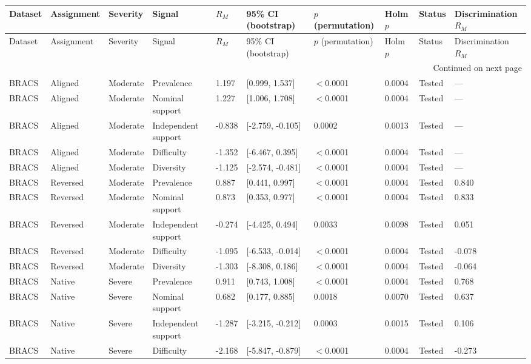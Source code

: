 \begin{longtable}{llllllllll}
\toprule
Dataset & Assignment & Severity & Signal & $R_M$ & 95\% CI (bootstrap) & $p$ (permutation) & Holm $p$ & Status & Discrimination $R_M$ \\
\midrule
\endfirsthead
\toprule
Dataset & Assignment & Severity & Signal & $R_M$ & 95\% CI (bootstrap) & $p$ (permutation) & Holm $p$ & Status & Discrimination $R_M$ \\
\midrule
\endhead
\midrule
\multicolumn{10}{r}{Continued on next page} \\
\midrule
\endfoot
\bottomrule
\endlastfoot
BRACS & Aligned & Moderate & Prevalence & 1.197 & [0.999, 1.537] & $<$0.0001 & 0.0004 & Tested & --- \\
BRACS & Aligned & Moderate & Nominal support & 1.227 & [1.006, 1.708] & $<$0.0001 & 0.0004 & Tested & --- \\
BRACS & Aligned & Moderate & Independent support & -0.838 & [-2.759, -0.105] & 0.0002 & 0.0013 & Tested & --- \\
BRACS & Aligned & Moderate & Difficulty & -1.352 & [-6.467, 0.395] & $<$0.0001 & 0.0004 & Tested & --- \\
BRACS & Aligned & Moderate & Diversity & -1.125 & [-2.574, -0.481] & $<$0.0001 & 0.0004 & Tested & --- \\
BRACS & Reversed & Moderate & Prevalence & 0.887 & [0.441, 0.997] & $<$0.0001 & 0.0004 & Tested & 0.840 \\
BRACS & Reversed & Moderate & Nominal support & 0.873 & [0.353, 0.977] & $<$0.0001 & 0.0004 & Tested & 0.833 \\
BRACS & Reversed & Moderate & Independent support & -0.274 & [-4.425, 0.494] & 0.0033 & 0.0098 & Tested & 0.051 \\
BRACS & Reversed & Moderate & Difficulty & -1.095 & [-6.533, -0.014] & $<$0.0001 & 0.0004 & Tested & -0.078 \\
BRACS & Reversed & Moderate & Diversity & -1.303 & [-8.308, 0.186] & $<$0.0001 & 0.0004 & Tested & -0.064 \\
BRACS & Native & Severe & Prevalence & 0.911 & [0.743, 1.008] & $<$0.0001 & 0.0004 & Tested & 0.768 \\
BRACS & Native & Severe & Nominal support & 0.682 & [0.177, 0.885] & 0.0018 & 0.0070 & Tested & 0.637 \\
BRACS & Native & Severe & Independent support & -1.287 & [-3.215, -0.212] & 0.0003 & 0.0015 & Tested & 0.106 \\
BRACS & Native & Severe & Difficulty & -2.168 & [-5.847, -0.879] & $<$0.0001 & 0.0004 & Tested & -0.273 \\

\end{longtable}
